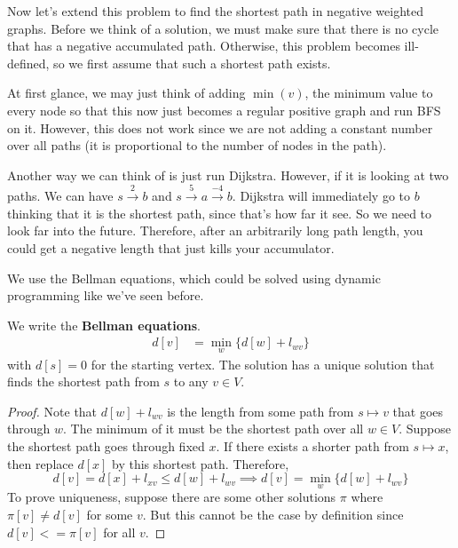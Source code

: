   Now let's extend this problem to find the shortest path in negative weighted graphs. Before we think of a solution, we must make sure that there is no cycle that has a negative accumulated path. Otherwise, this problem becomes ill-defined, so we first assume that such a shortest path exists. 

  At first glance, we may just think of adding $\min(v)$, the minimum value to every node so that this now just becomes a regular positive graph and run BFS on it. However, this does not work since we are not adding a constant number over all paths (it is proportional to the number of nodes in the path). 

  Another way we can think of is just run Dijkstra. However, if it is looking at two paths. We can have $s \xrightarrow{2} b$ and $s \xrightarrow{5} a \xrightarrow{-4} b$. Dijkstra will immediately go to $b$ thinking that it is the shortest path, since that's how far it see. So we need to look far into the future. Therefore, after an arbitrarily long path length, you could get a negative length that just kills your accumulator.  

  We use the Bellman equations, which could be solved using dynamic programming like we've seen before. 

  \begin{theorem}
    We write the \textbf{Bellman equations}. 
    \begin{align}
      d[v] & = \min_{w} \{ d[w] + l_{w v}\}
    \end{align}
    with $d[s] = 0$ for the starting vertex. The solution has a unique solution that finds the shortest path from $s$ to any $v \in V$.    
  \end{theorem}
  \begin{proof}
    Note that $d[w] + l_{wv}$ is the length from some path from $s \mapsto v$ that goes through $w$. The minimum of it must be the shortest path over all $w \in V$. Suppose the shortest path goes through fixed $x$. If there exists a shorter path from $s \mapsto x$, then replace $d[x]$ by this shortest path. Therefore, 
    \begin{equation}
      d[v] = d[x] + l_{xv} \leq d[w] + l_{wv} \implies d[v] = \min_{w} \{d[w] + l_{w v}\}
    \end{equation}
    To prove uniqueness, suppose there are some other solutions $\pi$ where $\pi[v] \neq d[v]$ for some $v$. But this cannot be the case by definition since $d[v] <= \pi[v]$ for all $v$. 
  \end{proof}

